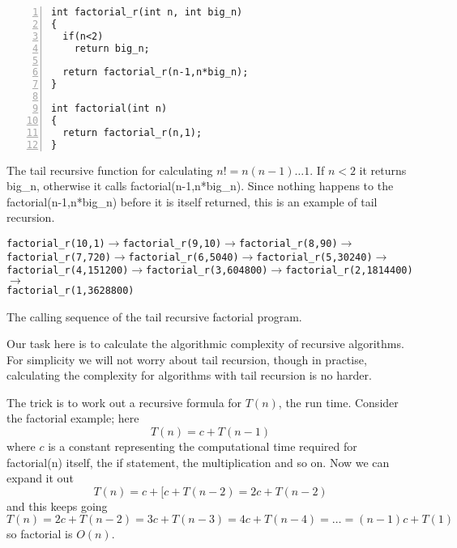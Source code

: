 \documentclass[11pt,a4paper]{scrartcl}
\begin{document}
\begin{table}
\begin{lstlisting}[numbers=left]
int factorial_r(int n, int big_n)
{
  if(n<2)
    return big_n;

  return factorial_r(n-1,n*big_n);
}

int factorial(int n)
{
  return factorial_r(n,1);
}
\end{lstlisting}
\caption{The tail recursive function for calculating $n!=n(n-1)\ldots
  1$. If $n<2$ it returns big\_n, otherwise it calls
  factorial(n-1,n*big\_n). Since nothing happens to the
  factorial(n-1,n*big\_n) before it is itself returned, this is an
  example of tail recursion.\label{c_factorial_tail}}
\end{table}

\begin{table}
\texttt{factorial\_r(10,1)}$\rightarrow$\texttt{factorial\_r(9,10)}$\rightarrow$\texttt{factorial\_r(8,90)}$\rightarrow$\\
\texttt{factorial\_r(7,720)}$\rightarrow$\texttt{factorial\_r(6,5040)}$\rightarrow$\texttt{factorial\_r(5,30240)}$\rightarrow$\\
\texttt{factorial\_r(4,151200)}$\rightarrow$\texttt{factorial\_r(3,604800)}$\rightarrow$\texttt{factorial\_r(2,1814400)}$\rightarrow$\\
\texttt{factorial\_r(1,3628800)}
\caption{The calling sequence of the tail recursive factorial program.\label{calling}}
\end{table}

Our task here is to calculate the algorithmic complexity of recursive
algorithms. For simplicity we will not worry about tail recursion,
though in practise, calculating the complexity for algorithms with
tail recursion is no harder.

The trick is to work out a recursive formula for $T(n)$, the run
time. Consider the factorial example; here
\begin{equation}
T(n)=c+T(n-1)
\end{equation}
where $c$ is a constant representing the computational time required
for factorial(n) itself, the if statement, the multiplication and so
on. Now we can expand it out
\begin{equation}
T(n)=c+[c+T(n-2)=2c+T(n-2)
\end{equation}
and this keeps going
\begin{equation}
T(n)=2c+T(n-2)=3c+T(n-3)=4c+T(n-4)=\ldots = (n-1)c+T(1)
\end{equation}
so factorial is $O(n)$. 
\end{document}
